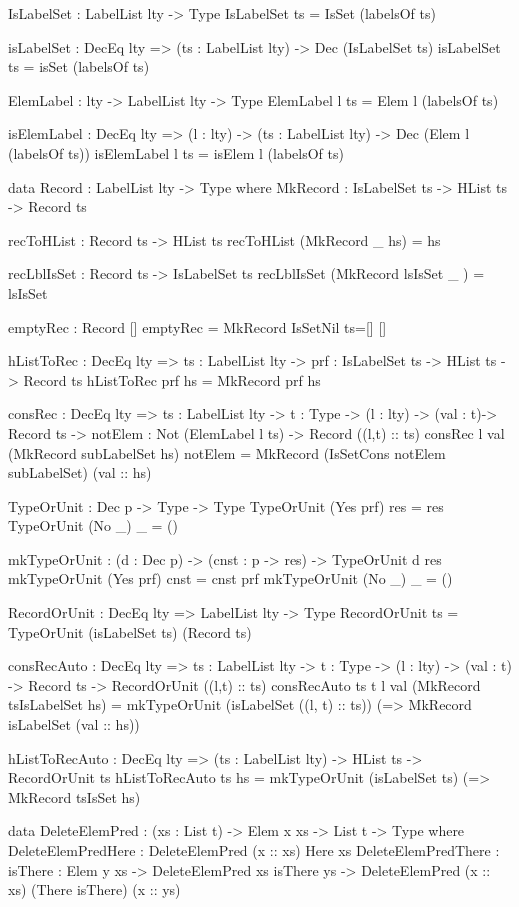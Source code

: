 \begin{code}
IsLabelSet : LabelList lty -> Type
IsLabelSet ts = IsSet (labelsOf ts)  

isLabelSet : DecEq lty => (ts : LabelList lty) -> Dec (IsLabelSet ts)
isLabelSet ts = isSet (labelsOf ts)

ElemLabel : lty -> LabelList lty -> Type
ElemLabel l ts = Elem l (labelsOf ts)

isElemLabel : DecEq lty => (l : lty) -> (ts : LabelList lty) -> 
  Dec (Elem l (labelsOf ts))
isElemLabel l ts = isElem l (labelsOf ts)

data Record : LabelList lty -> Type where
  MkRecord : IsLabelSet ts -> HList ts -> Record ts
       
recToHList : Record ts -> HList ts
recToHList (MkRecord _ hs) = hs

recLblIsSet : Record ts -> IsLabelSet ts
recLblIsSet (MkRecord lsIsSet _ ) = lsIsSet       
             
emptyRec : Record []
emptyRec = MkRecord IsSetNil {ts=[]} [] 
        
hListToRec : DecEq lty => {ts : LabelList lty} -> 
  {prf : IsLabelSet ts} -> HList ts -> Record ts
hListToRec {prf} hs = MkRecord prf hs

consRec : DecEq lty => {ts : LabelList lty} -> {t : Type} -> 
  (l : lty) -> (val : t)->  Record ts -> 
  {notElem : Not (ElemLabel l ts)} -> Record ((l,t) :: ts)
consRec l val (MkRecord subLabelSet hs) {notElem} = 
  MkRecord (IsSetCons notElem subLabelSet) (val :: hs)

TypeOrUnit : Dec p -> Type -> Type
TypeOrUnit (Yes prf) res = res
TypeOrUnit (No _) _ = ()

mkTypeOrUnit : (d : Dec p) -> (cnst : p -> res) -> TypeOrUnit d res
mkTypeOrUnit (Yes prf) cnst = cnst prf
mkTypeOrUnit (No _) _ = ()

RecordOrUnit : DecEq lty => LabelList lty -> Type
RecordOrUnit ts = TypeOrUnit (isLabelSet ts) (Record ts)
     
consRecAuto : DecEq lty => {ts : LabelList lty} -> {t : Type} -> 
  (l : lty) -> (val : t) -> Record ts -> 
  RecordOrUnit ((l,t) :: ts)
consRecAuto {ts} {t} l val (MkRecord tsIsLabelSet hs) = 
  mkTypeOrUnit (isLabelSet ((l, t) :: ts)) 
    (\isLabelSet => MkRecord isLabelSet (val :: hs))
    
hListToRecAuto : DecEq lty => (ts : LabelList lty) -> HList ts -> 
  RecordOrUnit ts
hListToRecAuto ts hs = mkTypeOrUnit (isLabelSet ts) 
  (\tsIsSet => MkRecord tsIsSet hs)       
        
data DeleteElemPred : (xs : List t) -> Elem x xs -> List t -> Type where
  DeleteElemPredHere : DeleteElemPred (x :: xs) Here xs
  DeleteElemPredThere : {isThere : Elem y xs} -> 
    DeleteElemPred xs isThere ys -> 
    DeleteElemPred (x :: xs) (There isThere) (x :: ys)


\end{code}
